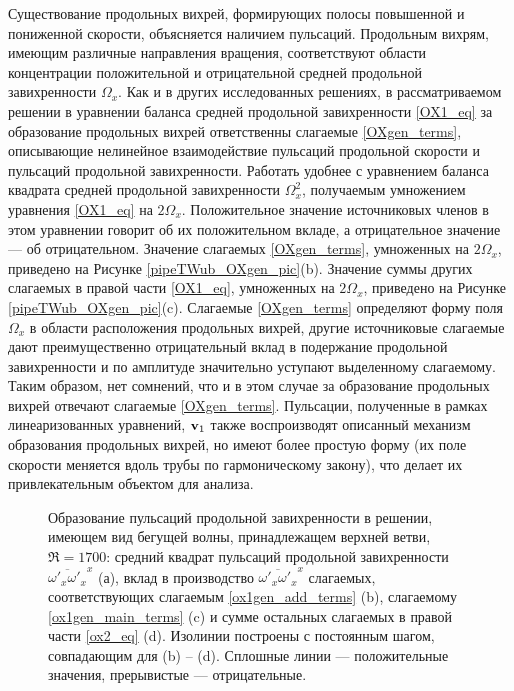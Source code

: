 Существование продольных вихрей, формирующих полосы повышенной и пониженной скорости, объясняется наличием пульсаций. Продольным вихрям, имеющим различные направления вращения, соответствуют области концентрации положительной и отрицательной средней продольной завихренности $\Omega_x$. Как и в других исследованных решениях, в рассматриваемом решении в уравнении баланса средней продольной завихренности \eqref{OX1_eq} за образование продольных вихрей ответственны слагаемые \eqref{OXgen_terms}, описывающие нелинейное взаимодействие пульсаций продольной скорости и пульсаций продольной завихренности. Работать удобнее с уравнением баланса квадрата средней продольной завихренности $\Omega_x^2$, получаемым умножением уравнения \eqref{OX1_eq} на $2\Omega_x$. Положительное значение источниковых членов в этом уравнении говорит об их положительном вкладе, а отрицательное значение --- об отрицательном. Значение слагаемых \eqref{OXgen_terms}, умноженных на $2\Omega_x$, приведено на Рисунке \ref{pipeTWub_OXgen_pic}(b). Значение суммы других слагаемых в правой части \eqref{OX1_eq}, умноженных на $2\Omega_x$, приведено на Рисунке \ref{pipeTWub_OXgen_pic}(c). Слагаемые \eqref{OXgen_terms} определяют форму поля $\Omega_x$ в области расположения продольных вихрей, другие источниковые слагаемые дают преимущественно отрицательный вклад в подержание продольной завихренности и по амплитуде значительно уступают выделенному слагаемому. Таким образом, нет сомнений, что и в этом случае за образование продольных вихрей отвечают слагаемые \eqref{OXgen_terms}. Пульсации, полученные в рамках линеаризованных уравнений, $\mathbf{v}_1$ также воспроизводят описанный механизм образования продольных вихрей, но имеют более простую форму (их поле скорости меняется вдоль трубы по гармоническому закону), что делает их привлекательным объектом для анализа. 

\begin{figure}[h]
\caption{Образование пульсаций продольной завихренности в решении, имеющем вид бегущей волны, принадлежащем верхней ветви, $\Re = 1700$: средний квадрат пульсаций продольной завихренности $\overline{\omega'_x \omega'_x }^x$ (а), вклад в производство $\overline{\omega'_x \omega'_x }^x$ слагаемых, соответствующих слагаемым \eqref{ox1gen_add_terms} (b), слагаемому \eqref{ox1gen_main_terms} (c) и сумме остальных слагаемых в правой части \eqref{ox2_eq} (d). Изолинии построены с постоянным шагом, совпадающим для (b) -- (d). Сплошные линии --- положительные значения, прерывистые --- отрицательные.}
\label{pipeTWub_ox1gen_pic}
\end{figure}

